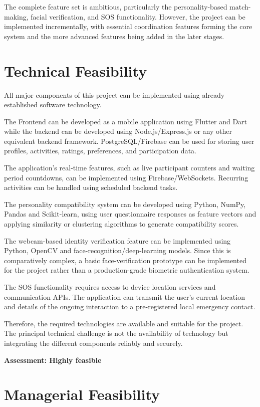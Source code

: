 \documentclass{tietreport}
\begin{document}
The complete feature set is ambitious, particularly the personality-based match-making,
facial verification, and SOS functionality. However, the project can be implemented
incrementally, with essential coordination features forming the core system and the more
advanced features being added in the later stages.

\section{Technical Feasibility}

All major components of this project can be implemented using already established
software technology.

The Frontend can be developed as a mobile application using Flutter and Dart while the
backend can be developed using Node.js/Express.js or any other equivalent backend
framework. PostgreSQL/Firebase can be used for storing user profiles, activities,
ratings, preferences, and participation data.

The application's real-time features, such as live participant counters and waiting
period countdowns, can be implemented using Firebase/WebSockets. Recurring activities can
be handled using scheduled backend tasks.

The personality compatibility system can be developed using Python, NumPy, Pandas and
Scikit-learn, using user questionnaire responses as feature vectors and applying
similarity or clustering algorithms to generate compatibility scores.

The webcam-based identity verification feature can be implemented using Python, OpenCV
and face-recognition/deep-learning models. Since this is comparatively complex, a basic
face-verification prototype can be implemented for the project rather than a
production-grade biometric authentication system.

The SOS functionality requires access to device location services and communication APIs.
The application can transmit the user's current location and details of the ongoing
interaction to a pre-registered local emergency contact.

Therefore, the required technologies are available and suitable for the project. The
principal technical challenge is not the availability of technology but integrating the
different components reliably and securely.

\noindent\textbf{Assessment: Highly feasible}

\section{Managerial Feasibility}
\end{document}
